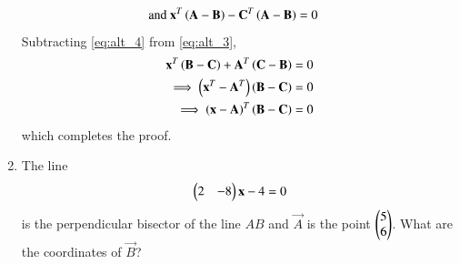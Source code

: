 \begin{enumerate}[label=\arabic*.,ref=\thesubsection.\theenumi]
\begin{align}
\text{and }\mathbf{x}^T\left(\mathbf{A}-\mathbf{B}\right)-\mathbf{C}^T\left(\mathbf{A}-\mathbf{B}\right) &= 0
\label{eq:alt_4}
\end{align}
%
Subtracting \eqref{eq:alt_4} from \eqref{eq:alt_3},
\begin{align}
\mathbf{x}^T\left(\mathbf{B}-\mathbf{C}\right) + \mathbf{A}^T\left(\mathbf{C}-\mathbf{B}\right) &= 0
\\
\implies \left(\mathbf{x}^T - \mathbf{A}^T\right)\left(\mathbf{B}-\mathbf{C}\right)  &= 0
\\
\implies \left(\mathbf{x} - \mathbf{A}\right)^T\left(\mathbf{B}-\mathbf{C}\right)  &= 0
\end{align}
%
which completes the proof.
\renewcommand{\theequation}{\theenumi}

\item The line
\begin{align}
\begin{pmatrix}2 &-8\end{pmatrix}\mathbf{x}-4=0
\end{align}
is the perpendicular bisector of the line $AB$ and $\vec{A}$ is the point $\begin{pmatrix}5\\6\end{pmatrix}$. What are the coordinates of $\vec{B}$?
\end{enumerate}
